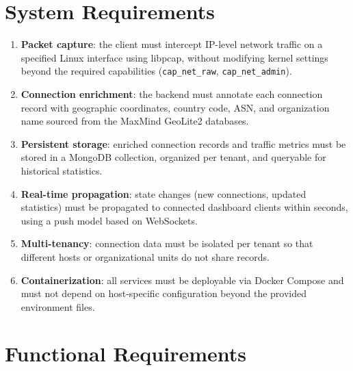 \documentclass[12pt]{report}
\begin{document}
\section{System Requirements}

\begin{enumerate}
  \item \textbf{Packet capture}: the client must intercept IP-level network
    traffic on a specified Linux interface using libpcap, without modifying
    kernel settings beyond the required capabilities (\texttt{cap\_net\_raw},
    \texttt{cap\_net\_admin}).
  \item \textbf{Connection enrichment}: the backend must annotate each
    connection record with geographic coordinates, country code, ASN, and
    organization name sourced from the MaxMind GeoLite2 databases.
  \item \textbf{Persistent storage}: enriched connection records and traffic
    metrics must be stored in a MongoDB collection, organized per tenant, and
    queryable for historical statistics.
  \item \textbf{Real-time propagation}: state changes (new connections, updated
    statistics) must be propagated to connected dashboard clients within seconds,
    using a push model based on WebSockets.
  \item \textbf{Multi-tenancy}: connection data must be isolated per tenant so
    that different hosts or organizational units do not share records.
  \item \textbf{Containerization}: all services must be deployable via Docker
    Compose and must not depend on host-specific configuration beyond the
    provided environment files.
\end{enumerate}

\newpage
\section{Functional Requirements}
\end{document}
